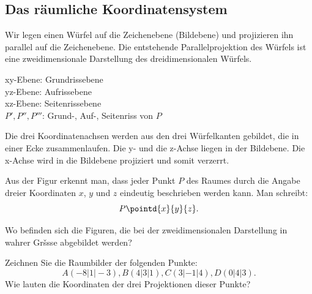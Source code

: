 \documentclass[%
11pt,%
twoside,%
titlepage,%
german,%
headsepline%
]{scrartcl}
\begin{document}
\subsection{Das r\"aumliche Koordinatensystem}
Wir legen einen W\"urfel auf die Zeichenebene (Bildebene) und projizieren ihn parallel auf die Zeichenebene. Die entstehende Parallelprojektion des W\"urfels ist eine zweidimensionale Darstellung des dreidimensionalen W\"urfels.
\begin{center}

xy-Ebene: Grundrissebene\\
yz-Ebene: Aufrissebene\\
xz-Ebene: Seitenrissebene\\
$P', P'', P'''$: Grund-, Auf-, Seitenriss von $P$
\end{center}
Die drei Koordinatenachsen werden aus den drei W\"urfelkanten gebildet, die in einer Ecke zusammenlaufen. Die y- und die z-Achse liegen in der Bildebene. Die x-Achse wird in die Bildebene projiziert und somit verzerrt.

Aus der Figur erkennt man, dass jeder Punkt $P$ des Raumes durch die Angabe dreier Koordinaten $x$, $y$ und $z$ eindeutig beschrieben werden kann. Man schreibt:
$$P\pointd{x}{y}{z}.$$

\begin{ueb}
Wo befinden sich die Figuren, die bei der zweidimensionalen Darstellung in wahrer Gršsse abgebildet werden?
\end{ueb}
\begin{ueb}
Zeichnen Sie die Raumbilder der folgenden Punkte:
$$A(-8|1|-3), B(4|3|1), C(3|-1|4), D(0|4|3).$$ Wie lauten die Koordinaten der drei Projektionen dieser Punkte?
\end{ueb}
\end{document}
